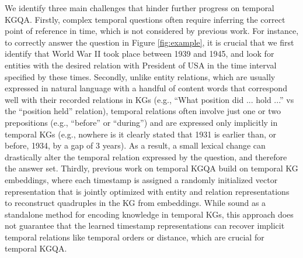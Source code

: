 \documentclass[11pt]{article}
\begin{document}
We identify three main challenges that hinder further progress on temporal KGQA.
Firstly, complex temporal questions often require inferring the correct point of reference in time, which is not considered by previous work.
For instance, to correctly answer the question in Figure \ref{fig:example}, it is crucial that we first identify that World War II took place between 1939 and 1945, and look for entities with the desired relation with President of USA in the time interval specified by these times.
Secondly, unlike entity relations, which are usually expressed in natural language with a handful of content words that correspond well with their recorded relations in KGs (e.g., ``What position did ... hold ...'' vs the ``position held'' relation), temporal relations often involve just one or two prepositions (e.g., ``before'' or ``during'') and are expressed only implicitly in temporal KGs (e.g., nowhere is it clearly stated that 1931 is earlier than, or before, 1934, by a gap of 3 years).
As a result, a small lexical change can drastically alter the temporal relation expressed by the question, and therefore the answer set.
Thirdly, previous work on temporal KGQA build on temporal KG embeddings, where each timestamp is assigned a randomly initialized vector representation that is jointly optimized with entity and relation representations to reconstruct quadruples in the KG from embeddings.
While sound as a standalone method for encoding knowledge in temporal KGs, this approach does not guarantee that the learned timestamp representations can recover implicit temporal relations like temporal orders or distance, which are crucial for temporal KGQA.
\end{document}
